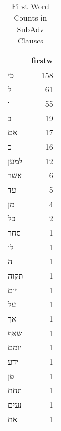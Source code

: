 \begin{table}[htbp!]
\centering
\caption{First Word Counts in SubAdv Clauses}
\label{table:SubAdv_front}
\begin{tabular}{lr}
\toprule
{} &  firstw \\
\midrule
\texthebrew{כי}   &     158 \\
\texthebrew{ל}    &      61 \\
\texthebrew{ו}    &      55 \\
\texthebrew{ב}    &      19 \\
\texthebrew{אם}   &      17 \\
\texthebrew{כ}    &      16 \\
\texthebrew{למען} &      12 \\
\texthebrew{אשר}  &       6 \\
\texthebrew{עד}   &       5 \\
\texthebrew{מן}   &       4 \\
\texthebrew{כל}   &       2 \\
\texthebrew{סחר}  &       1 \\
\texthebrew{לו}   &       1 \\
\texthebrew{ה}    &       1 \\
\texthebrew{תקוה} &       1 \\
\texthebrew{יום}  &       1 \\
\texthebrew{על}   &       1 \\
\texthebrew{אך}   &       1 \\
\texthebrew{שאף}  &       1 \\
\texthebrew{יומם} &       1 \\
\texthebrew{ידע}  &       1 \\
\texthebrew{פן}   &       1 \\
\texthebrew{תחת}  &       1 \\
\texthebrew{נעים} &       1 \\
\texthebrew{את}   &       1 \\
\bottomrule
\end{tabular}
\end{table}
